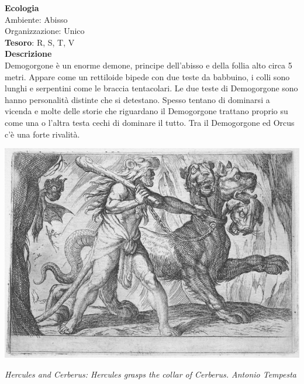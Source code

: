 \begin{multicols}{2}
{\textbf{Ecologia}\\
Ambiente: Abisso\\
Organizzazione: Unico\\
\textbf{Tesoro}: R, S, T, V\\
\textbf{Descrizione}\\
Demogorgone è un enorme demone, principe dell'abisso e della follia alto circa 5 metri. Appare come un rettiloide bipede con due teste da babbuino, i colli sono lunghi e serpentini come le braccia tentacolari. Le due teste di Demogorgone sono hanno personalità distinte che si detestano. Spesso tentano di dominarsi a vicenda e molte delle storie che riguardano il Demogorgone trattano proprio su come una o l'altra testa cechi di dominare il tutto. Tra il Demogorgone ed Orcus c'è una forte rivalità.


\begin{center}
	\includegraphics[width=0.9\linewidth]{immagini/ercole-cerbero_grayscale.png}

	\emph{Hercules and Cerberus: Hercules grasps the collar of Cerberus. Antonio Tempesta}
\end{center}

}
\end{multicols}
